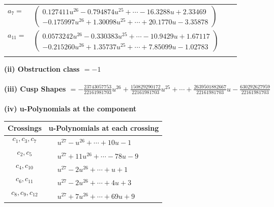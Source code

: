 \documentclass[1p]{elsarticle_modified}
\theoremstyle{definition}
\begin{document}
\begin{tabular}{m{7pt} m{180pt} m{7pt} m{180pt} }
\flushright $a_{7}=$&$\begin{pmatrix}0.127411 u^{26}-0.794874 u^{25}+\cdots-16.3288 u+2.33469\\-0.175997 u^{26}+1.30098 u^{25}+\cdots+20.1770 u-3.35878\end{pmatrix}$ \\
\flushright $a_{11}=$&$\begin{pmatrix}0.0573242 u^{26}-0.330383 u^{25}+\cdots-10.9429 u+1.67117\\-0.215260 u^{26}+1.35737 u^{25}+\cdots+7.85099 u-1.02783\end{pmatrix}$\\&\end{tabular}
\flushleft \textbf{(ii) Obstruction class $= -1$}\\~\\
\flushleft \textbf{(iii) Cusp Shapes $= -\frac{23743057753}{22161981703} u^{26}+\frac{150829290172}{22161981703} u^{25}+\cdots+\frac{2639501882667}{22161981703} u-\frac{630292627959}{22161981703}$}\\~\\
\newpage\renewcommand{\arraystretch}{1}
\flushleft \textbf{(iv) u-Polynomials at the component}\newline \\
\begin{tabular}{m{50pt}|m{274pt}}
Crossings & \hspace{64pt}u-Polynomials at each crossing \\
\hline $$\begin{aligned}c_{1},c_{3},c_{7}\end{aligned}$$&$\begin{aligned}
&u^{27}- u^{26}+\cdots+10 u-1
\end{aligned}$\\
\hline $$\begin{aligned}c_{2},c_{5}\end{aligned}$$&$\begin{aligned}
&u^{27}+11 u^{26}+\cdots-78 u-9
\end{aligned}$\\
\hline $$\begin{aligned}c_{4},c_{10}\end{aligned}$$&$\begin{aligned}
&u^{27}-2 u^{26}+\cdots+u+1
\end{aligned}$\\
\hline $$\begin{aligned}c_{6},c_{11}\end{aligned}$$&$\begin{aligned}
&u^{27}-2 u^{26}+\cdots+4 u+3
\end{aligned}$\\
\hline $$\begin{aligned}c_{8},c_{9},c_{12}\end{aligned}$$&$\begin{aligned}
&u^{27}+7 u^{26}+\cdots+69 u+9
\end{aligned}$\\
\hline
\end{tabular}\\~\\
\end{document}
